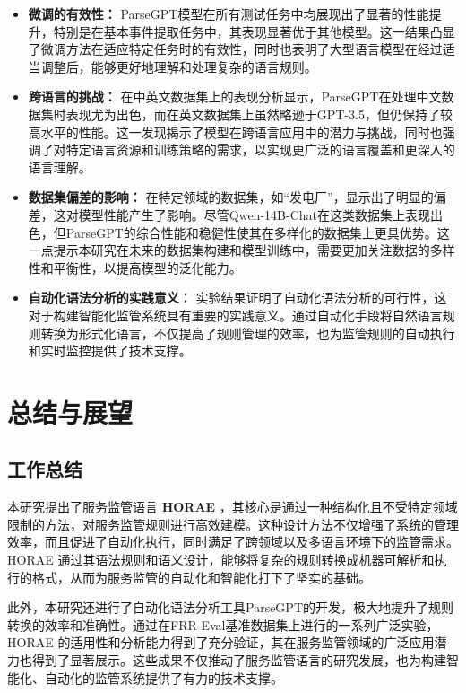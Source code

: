 \begin{itemize}
    \item \textbf{微调的有效性：} ParseGPT模型在所有测试任务中均展现出了显著的性能提升，特别是在基本事件提取任务中，其表现显著优于其他模型。这一结果凸显了微调方法在适应特定任务时的有效性，同时也表明了大型语言模型在经过适当调整后，能够更好地理解和处理复杂的语言规则。    
    \item \textbf{跨语言的挑战：} 在中英文数据集上的表现分析显示，ParseGPT在处理中文数据集时表现尤为出色，而在英文数据集上虽然略逊于GPT-3.5，但仍保持了较高水平的性能。这一发现揭示了模型在跨语言应用中的潜力与挑战，同时也强调了对特定语言资源和训练策略的需求，以实现更广泛的语言覆盖和更深入的语言理解。    
    \item \textbf{数据集偏差的影响：} 在特定领域的数据集，如“发电厂”，显示出了明显的偏差，这对模型性能产生了影响。尽管Qwen-14B-Chat在这类数据集上表现出色，但ParseGPT的综合性能和稳健性使其在多样化的数据集上更具优势。这一点提示本研究在未来的数据集构建和模型训练中，需要更加关注数据的多样性和平衡性，以提高模型的泛化能力。    
    \item \textbf{自动化语法分析的实践意义：} 实验结果证明了自动化语法分析的可行性，这对于构建智能化监管系统具有重要的实践意义。通过自动化手段将自然语言规则转换为形式化语言，不仅提高了规则管理的效率，也为监管规则的自动执行和实时监控提供了技术支撑。
\end{itemize}

\newpage

\section{总结与展望}

\subsection{工作总结}

本研究提出了服务监管语言 \textbf{HORAE} ，其核心是通过一种结构化且不受特定领域限制的方法，对服务监管规则进行高效建模。这种设计方法不仅增强了系统的管理效率，而且促进了自动化执行，同时满足了跨领域以及多语言环境下的监管需求。HORAE 通过其语法规则和语义设计，能够将复杂的规则转换成机器可解析和执行的格式，从而为服务监管的自动化和智能化打下了坚实的基础。

此外，本研究还进行了自动化语法分析工具ParseGPT的开发，极大地提升了规则转换的效率和准确性。通过在FRR-Eval基准数据集上进行的一系列广泛实验，HORAE 的适用性和分析能力得到了充分验证，其在服务监管领域的广泛应用潜力也得到了显著展示。这些成果不仅推动了服务监管语言的研究发展，也为构建智能化、自动化的监管系统提供了有力的技术支撑。


